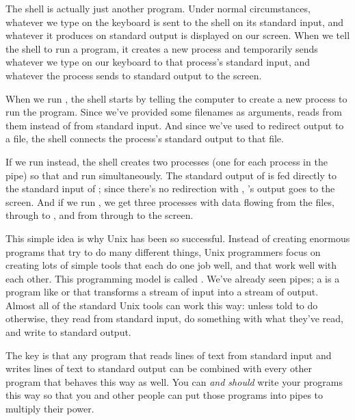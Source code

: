 The shell is actually just another program. Under normal circumstances,
whatever we type on the keyboard is sent to the shell on its standard
input, and whatever it produces on standard output is displayed on our
screen. When we tell the shell to run a program, it creates a new
process and temporarily sends whatever we type on our keyboard to that
process's standard input, and whatever the process sends to standard
output to the screen.

When we run
, the shell starts by telling
the computer to create a new process to run the  program.
Since we've provided some filenames as arguments,  reads
from them instead of from standard input. And since we've used
\code{\textgreater{}} to redirect output to a file, the shell connects
the process's standard output to that file.

If we run  instead, the shell
creates two processes (one for each process in the pipe) so that
 and  run simultaneously. The standard output of
 is fed directly to the standard input of ;
since there's no redirection with \code{\textgreater{}},
's output goes to the screen. And if we run
, we get three
processes with data flowing from the files, through  to
, and from  through  to the
screen.

This simple idea is why Unix has been so successful. Instead of creating
enormous programs that try to do many different things, Unix programmers
focus on creating lots of simple tools that each do one job well, and
that work well with each other. This programming model is called
. We've already seen
pipes; a  is a program like  or
 that transforms a stream of input into a stream of output.
Almost all of the standard Unix tools can work this way: unless told to
do otherwise, they read from standard input, do something with what
they've read, and write to standard output.

The key is that any program that reads lines of text from standard input
and writes lines of text to standard output can be combined with every
other program that behaves this way as well. You can \emph{and should}
write your programs this way so that you and other people can put those
programs into pipes to multiply their power.


